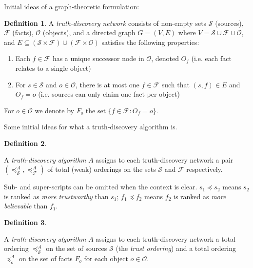 \documentclass{article}
\theoremstyle{definition}
\newtheorem{definition}{Definition}
\theoremstyle{plain}
\begin{document}
Initial ideas of a graph-theoretic formulation:

\begin{definition}

A \emph{truth-discovery network} consists of non-empty sets $\mathcal{S}$
(sources), $\mathcal{F}$ (facts), $\mathcal{O}$ (objects), and a directed graph
$G=(V, E)$ where $V = \mathcal{S} \cup \mathcal{F} \cup \mathcal{O}$, and $E
\subseteq (\mathcal{S} \times \mathcal{F}) \cup (\mathcal{F} \times
\mathcal{O})$ satisfies the following properties:

\begin{enumerate}

\item Each $f \in \mathcal{F}$ has a unique successor node in $\mathcal{O}$,
denoted $O_f$ (i.e. each fact relates to a single object)

\item For $s \in \mathcal{S}$ and $o \in \mathcal{O}$, there is at most one $f
\in \mathcal{F}$ such that $(s, f) \in E$ and $O_f = o$ (i.e. sources can only
claim one fact per object)

\end{enumerate}

For $o \in \mathcal{O}$ we denote by $F_o$ the set $\{f \in \mathcal{F} : O_f =
o \}$.

\end{definition}

Some initial ideas for what a truth-discovery algorithm is.

\begin{definition}
\label{def:ordinal}

A \emph{truth-discovery algorithm} $A$ assigns to each truth-discovery network
a pair $(\preceq_\mathcal{S}^A, \preceq_\mathcal{F}^A)$ of total (weak)
orderings on the sets $\mathcal{S}$ and $\mathcal{F}$ respectively.

Sub- and super-scripts can be omitted when the context is clear. $s_1 \preceq
s_2$ means $s_2$ is ranked as \emph{more trustworthy} than $s_1$; $f_1 \preceq
f_2$ means $f_2$ is ranked as \emph{more believable} than $f_1$.

\end{definition}

\begin{definition}
\label{def:ordinal_per_object}

A \emph{truth-discovery algorithm} $A$ assigns to each truth-discovery network
a total ordering $\preceq_\mathcal{S}^A$ on the set of sources $\mathcal{S}$
(the \emph{trust ordering}) and a total ordering $\preceq_o^A$ on the set of
facts $F_o$ for each object $o \in \mathcal{O}$.

\end{definition}
\end{document}
